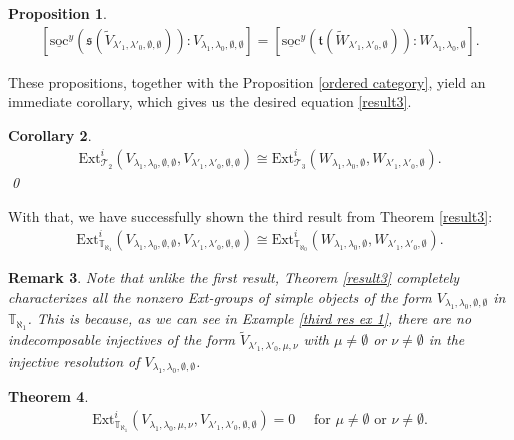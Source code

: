 \documentclass[openany, a4paper]{amsbook}
\newtheorem{thm}{Theorem}[chapter]
\newtheorem{prop}[thm]{Proposition}
\newtheorem{cor}[thm]{Corollary}
\newtheorem{rmk}[thm]{Remark}
\theoremstyle{definition}
\numberwithin{equation}{chapter}
\newcommand{\T}[1]{{\mathbb{T}}_{\aleph_{#1}}}
\newcommand{\socl}[2]{\underline{\mathrm{soc}}^{#1}({#2})}
\newcommand{\Ext}[4]{\mathrm{Ext}^{#1}_{#2}({#3}, {#4})}
\begin{document}
\begin{prop}\label{result 3 prop}
    \begin{align*}
        \left[ \socl{y}{\mathfrak{s}(\tilde{V}_{\lambda'_1, \lambda'_0, \emptyset, \emptyset})} \colon V_{\lambda_1, \lambda_0, \emptyset, \emptyset}  \right]
        = \left[ \socl{y}{\mathfrak{t}(\tilde{W}_{\lambda'_1, \lambda'_0, \emptyset})} \colon W_{\lambda_1, \lambda_0, \emptyset}  \right].
    \end{align*}
\end{prop}

These propositions, together with the Proposition \ref{ordered category}, yield an immediate corollary, which gives us the desired equation \eqref{result3}.
\begin{cor}
    \begin{align}
        \Ext{i}{\mathcal{T}_2}{V_{\lambda_1, \lambda_0, \emptyset, \emptyset}}{V_{\lambda'_1, \lambda'_0, \emptyset, \emptyset}} \cong \Ext{i}{\mathcal{T}_3}{W_{\lambda_1, \lambda_0, \emptyset}}{W_{\lambda'_1, \lambda'_0, \emptyset}}.
    \end{align}
    \qed
\end{cor}

With that, we have successfully shown the third result from Theorem \ref{result3}: 
\begin{align*}
    \Ext{i}{\T{1}}{V_{\lambda_1, \lambda_0, \emptyset, \emptyset}}{V_{\lambda'_1, \lambda'_0, \emptyset, \emptyset}} \cong
    \Ext{i}{\T{0}}{W_{\lambda_1, \lambda_0, \emptyset}}{W_{\lambda'_1, \lambda'_0, \emptyset}}.
\end{align*}

\begin{rmk}
    Note that unlike the first result, Theorem \ref{result3} completely characterizes all the nonzero Ext-groups of simple objects of the form $V_{\lambda_1, \lambda_0, \emptyset, \emptyset}$ in $\T{1}$. This is because, as we can see in Example \ref{third res ex 1}, there are no indecomposable injectives of the form $\tilde{V}_{\lambda'_1, \lambda'_0, \mu, \nu}$ with $\mu \neq \emptyset$ or $\nu \neq \emptyset$  in the injective resolution of $V_{\lambda_1, \lambda_0, \emptyset, \emptyset}$.
\end{rmk}

\begin{thm}\label{second result 2}
    \begin{align}
        \Ext{i}{\T{1}}{V_{\lambda_1, \lambda_0, \mu, \nu}}{V_{\lambda'_1, \lambda'_0, \emptyset, \emptyset}} = 0 \quad \text{ for } \mu \neq \emptyset \text{ or } \nu \neq \emptyset.
    \end{align}
\end{thm}
\end{document}
